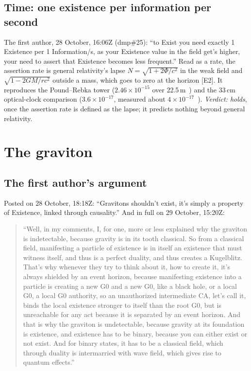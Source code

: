 \documentclass[11pt,a4paper]{article}
\theoremstyle{definition}
\theoremstyle{remark}
\newcommand{\chk}[1]{\textsf{[#1]}}
\begin{document}
\subsection{Time: one existence per information per second}\label{sec:time}

The first author, 28 October, 16:06Z (dmp\#25): ``to Exist you need exactly 1 Existence per 1
Information/s, as your Existence value in the field get's higher, your need to assert that Existence becomes less frequent.'' Read as a
rate, the assertion rate is general relativity's lapse $N=\sqrt{1+2\Phi/c^2}$ in the weak field and $\sqrt{1-2GM/rc^2}$ outside a
mass, which goes to zero at the horizon \chk{E2}. It reproduces the Pound--Rebka tower ($2.46\times10^{-15}$ over 22.5\,m~\cite{pr60})
and the 33\,cm optical-clock comparison ($3.6\times10^{-17}$, measured about $4\times10^{-17}$~\cite{chou}). \emph{Verdict: holds}, once
the assertion rate is defined as the lapse; it predicts nothing beyond general relativity.

\section{The graviton}\label{sec:graviton}

\subsection{The first author's argument}

Posted on 28 October, 18:18Z: ``Gravitons shouldn't exist, it's simply a property of Existence, linked through causality.'' And in full
on 29 October, 15:20Z:

\begin{quote}
``Well, in my comments, I, for one, more or less explained why the graviton is indetectable, because gravity is in its tooth classical.
So from a classical field, manifesting a particle of existence is in itself an existence that must witness itself, and thus is a perfect
duality, and thus creates a Kugelblitz. That's why whenever they try to think about it, how to create it, it's always shielded by an
event horizon, because manifesting existence into a particle is creating a new G0 and a new G0, like a black hole, or a local G0, a local
G0 authority, so an unauthorized intermediate CA, let's call it, binds the local existence stronger to itself than the root G0, but is
unreachable for any act because it is separated by an event horizon. And that is why the graviton is undetectable, because gravity at its
foundation is existence, and existence has to be binary, because you can either exist or not exist. And for binary states, it has to be a
classical field, which through duality is intermarried with wave field, which gives rise to quantum effects.''
\end{quote}
\end{document}
